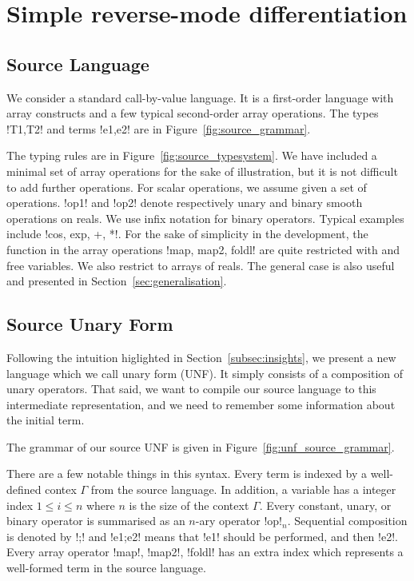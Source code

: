 \section{Simple reverse-mode differentiation}
\label{sec:simplediff}

\subsection{Source Language} 

We consider a standard call-by-value language. 
It is a first-order language with array constructs and a few typical second-order array operations. 
The types !T1,T2! and terms !e1,e2! are in Figure~\ref{fig:source_grammar}.



The typing rules are in Figure~\ref{fig:source_typesystem}. We have included a minimal set of array operations for the sake of illustration, 
but it is not difficult to add further operations. For scalar operations, we assume given a set of operations. 
!op1! and !op2! denote respectively unary and binary smooth operations on reals. 
We use infix notation for binary operators.
Typical examples include !cos, exp, +, *!. 
For the sake of simplicity in the development, the function in the array operations !map, map2, foldl! are quite restricted with and free variables. 
We also restrict to arrays of reals.
The general case is also useful and presented in Section~\ref{sec:generalisation}.



\subsection{Source Unary Form} 

Following the intuition higlighted in Section~\ref{subsec:insights}, we present a new language which we call unary form (UNF). 
It simply consists of a composition of unary operators. That said, we want to compile our source language to this intermediate representation, 
and we need to remember some information about the initial term. 

The grammar of our source UNF is given in Figure~\ref{fig:unf_source_grammar}. 



There are a few notable things in this syntax. 
Every term is indexed by a well-defined contex $\Gamma$ from the source language.
In addition, a variable has a integer index $1\leq i\leq n$ where $n$ is the size of the context $\Gamma$.
Every constant, unary, or binary operator is summarised as an $n$-ary operator !op!$_n$.
Sequential composition is denoted by !;! and !e1;e2! means that !e1! should be performed, and then !e2!.
Every array operator !map!, !map2!, !foldl! has an extra index which represents a well-formed term in the source language.

